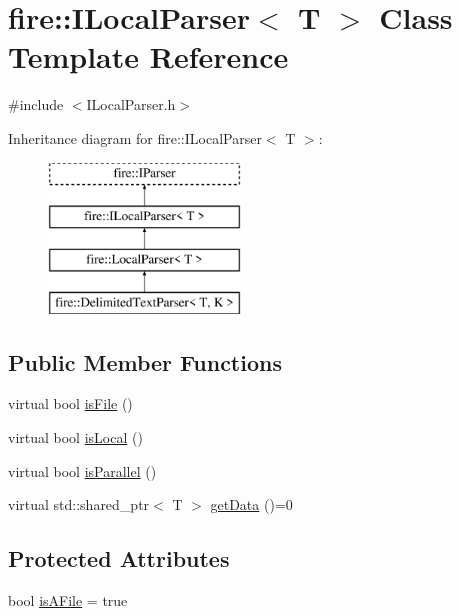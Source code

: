 \hypertarget{a01275}{}\section{fire\+:\+:I\+Local\+Parser$<$ T $>$ Class Template Reference}
\label{a01275}


{\ttfamily \#include $<$I\+Local\+Parser.\+h$>$}

Inheritance diagram for fire\+:\+:I\+Local\+Parser$<$ T $>$\+:\begin{figure}[H]
\begin{center}
\leavevmode
\includegraphics[height=4.000000cm]{a01275}
\end{center}
\end{figure}
\subsection*{Public Member Functions}
\begin{DoxyCompactItemize}
\item 
virtual bool \hyperlink{a01275_a091d5cf56bf8f407854ef87f460b2958}{is\+File} ()
\item 
virtual bool \hyperlink{a01275_a770acae6e216de3a9c7140a12de25d58}{is\+Local} ()
\item 
virtual bool \hyperlink{a01275_ad46898c516adcce38acbb4800dc9777b}{is\+Parallel} ()
\item 
virtual std\+::shared\+\_\+ptr$<$ T $>$ \hyperlink{a01275_a0fc1446d106f0ab8daf8744a4bd29a65}{get\+Data} ()=0
\end{DoxyCompactItemize}
\subsection*{Protected Attributes}
\begin{DoxyCompactItemize}
\item 
bool \hyperlink{a01275_a39adf288ae0bc79cf39fd6e4638858cf}{is\+A\+File} = true
\end{DoxyCompactItemize}


